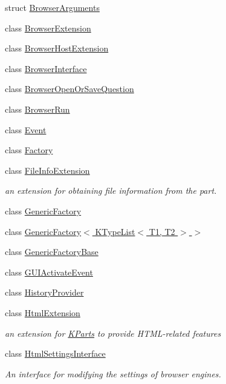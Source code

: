 \begin{DoxyCompactItemize}
\item 
struct \hyperlink{structKParts_1_1BrowserArguments}{Browser\+Arguments}
\item 
class \hyperlink{classKParts_1_1BrowserExtension}{Browser\+Extension}
\item 
class \hyperlink{classKParts_1_1BrowserHostExtension}{Browser\+Host\+Extension}
\item 
class \hyperlink{classKParts_1_1BrowserInterface}{Browser\+Interface}
\item 
class \hyperlink{classKParts_1_1BrowserOpenOrSaveQuestion}{Browser\+Open\+Or\+Save\+Question}
\item 
class \hyperlink{classKParts_1_1BrowserRun}{Browser\+Run}
\item 
class \hyperlink{classKParts_1_1Event}{Event}
\item 
class \hyperlink{classKParts_1_1Factory}{Factory}
\item 
class \hyperlink{classKParts_1_1FileInfoExtension}{File\+Info\+Extension}
\begin{DoxyCompactList}\small\item\em an extension for obtaining file information from the part. \end{DoxyCompactList}\item 
class \hyperlink{classKParts_1_1GenericFactory}{Generic\+Factory}
\item 
class \hyperlink{classKParts_1_1GenericFactory_3_01KTypeList_3_01T1_00_01T2_01_4_01_4}{Generic\+Factory$<$ K\+Type\+List$<$ T1, T2 $>$ $>$}
\item 
class \hyperlink{classKParts_1_1GenericFactoryBase}{Generic\+Factory\+Base}
\item 
class \hyperlink{classKParts_1_1GUIActivateEvent}{G\+U\+I\+Activate\+Event}
\item 
class \hyperlink{classKParts_1_1HistoryProvider}{History\+Provider}
\item 
class \hyperlink{classKParts_1_1HtmlExtension}{Html\+Extension}
\begin{DoxyCompactList}\small\item\em an extension for \hyperlink{namespaceKParts}{K\+Parts} to provide H\+T\+M\+L-\/related features \end{DoxyCompactList}\item 
class \hyperlink{classKParts_1_1HtmlSettingsInterface}{Html\+Settings\+Interface}
\begin{DoxyCompactList}\small\item\em An interface for modifying the settings of browser engines. \end{DoxyCompactList}\item 

\end{DoxyCompactItemize}
